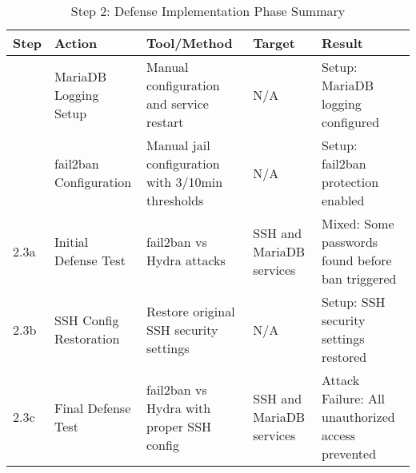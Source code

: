 \begin{table}[h!]
\centering
\footnotesize
\begin{tabularx}{\textwidth}{|>{\raggedright\arraybackslash}X|>{\raggedright\arraybackslash}X|>{\raggedright\arraybackslash}X|>{\raggedright\arraybackslash}X|>{\raggedright\arraybackslash}X|}
\hline
\textbf{Step} & \textbf{Action} & \textbf{Tool/Method} & \textbf{Target} & \textbf{Result} \\
\hline
2.1 & MariaDB Logging Setup & Manual configuration and service restart & N/A & \cellcolor{blue!20}Setup: MariaDB logging configured \\
\hline
2.2 & fail2ban Configuration & Manual jail configuration with 3/10min thresholds & N/A & \cellcolor{blue!20}Setup: fail2ban protection enabled \\
\hline
2.3a & Initial Defense Test & fail2ban vs Hydra attacks & SSH and MariaDB services & \cellcolor{yellow!20}Mixed: Some passwords found before ban triggered \\
\hline
2.3b & SSH Config Restoration & Restore original SSH security settings & N/A & \cellcolor{blue!20}Setup: SSH security settings restored \\
\hline
2.3c & Final Defense Test & fail2ban vs Hydra with proper SSH config & SSH and MariaDB services & \cellcolor{red!20}Attack Failure: All unauthorized access prevented \\
\hline
\end{tabularx}
\caption{Step 2: Defense Implementation Phase Summary}
\label{tab:step2-summary}
\end{table}